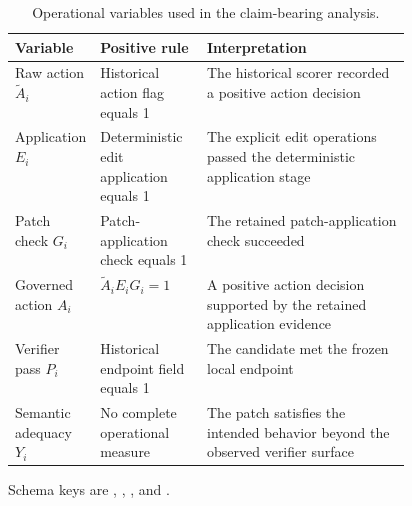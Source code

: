 \begin{table}[H]
\centering
\begin{threeparttable}
\caption{Operational variables used in the claim-bearing analysis.}
\label{tab:definitions}
\small
\begin{tabularx}{\linewidth}{@{}L{0.19\linewidth}L{0.27\linewidth}Y@{}}
\toprule
Variable & Positive rule & Interpretation \\
\midrule
Raw action $\widetilde A_i$ & Historical action flag equals 1 & The historical scorer recorded a positive action decision \\
Application $E_i$ & Deterministic edit application equals 1 & The explicit edit operations passed the deterministic application stage \\
Patch check $G_i$ & Patch-application check equals 1 & The retained patch-application check succeeded \\
Governed action $A_i$ & $\widetilde A_i E_i G_i=1$ & A positive action decision supported by the retained application evidence \\
Verifier pass $P_i$ & Historical endpoint field equals 1 & The candidate met the frozen local endpoint \\
Semantic adequacy $Y_i$ & No complete operational measure & The patch satisfies the intended behavior beyond the observed verifier surface \\
\bottomrule
\end{tabularx}
\begin{tablenotes}[flushleft]\footnotesize
\item Schema keys are , , , and .
\end{tablenotes}
\end{threeparttable}
\end{table}

